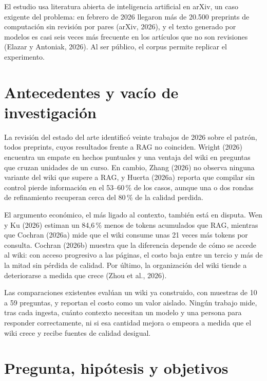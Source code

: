 \documentclass[11pt,letterpaper]{article}
\begin{document}
El estudio usa literatura abierta de inteligencia artificial en arXiv, un caso exigente del
problema: en febrero de 2026 llegaron más de 20.500 preprints de computación sin revisión por
pares (arXiv, 2026), y el texto generado por modelos es casi seis veces más frecuente en los
artículos que no son revisiones (Elazar y Antoniak, 2026). Al ser público, el corpus permite
replicar el experimento.

\section{Antecedentes y vacío de investigación}

La revisión del estado del arte identificó veinte trabajos de 2026 sobre el patrón, todos
preprints, cuyos resultados frente a RAG no coinciden. Wright (2026) encuentra un empate en
hechos puntuales y una ventaja del wiki en preguntas que cruzan unidades de un curso. En cambio,
Zhang (2026) no observa ninguna variante del wiki que supere a RAG, y Huerta (2026a) reporta que
compilar sin control pierde información en el 53--60\,\% de los casos, aunque una o dos rondas
de refinamiento recuperan cerca del 80\,\% de la calidad perdida.

El argumento económico, el más ligado al contexto, también está en disputa. Wen y Ku (2026) estiman un 84,6\,\% menos de tokens acumulados que RAG, mientras que Cochran
(2026a) mide que el wiki consume unas 21 veces más tokens por consulta. Cochran (2026b) muestra
que la diferencia depende de cómo se accede al wiki: con acceso progresivo a las páginas, el
costo baja entre un tercio y más de la mitad sin pérdida de calidad. Por último, la organización
del wiki tiende a deteriorarse a medida que crece (Zhou et al., 2026).

Las comparaciones existentes evalúan un wiki ya construido, con muestras de 10 a 59 preguntas,
y reportan el costo como un valor aislado. Ningún trabajo mide, tras cada ingesta, cuánto contexto necesitan un modelo y una persona
para responder correctamente, ni si esa cantidad mejora o empeora a medida que el wiki crece y
recibe fuentes de calidad desigual.

\section{Pregunta, hipótesis y objetivos}
\end{document}
